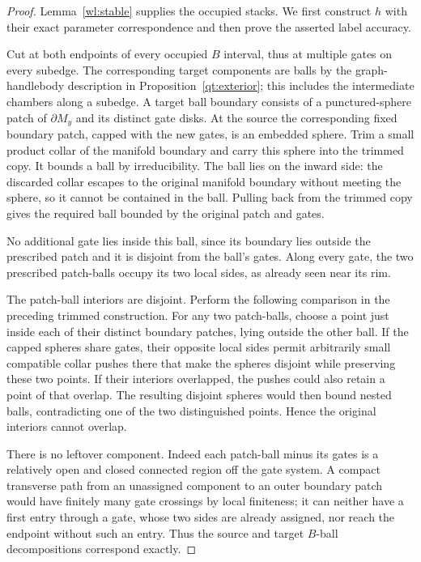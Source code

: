 \documentclass[11pt]{article}
\numberwithin{equation}{section}
\theoremstyle{definition}
\theoremstyle{remark}
\begin{document}
\begin{proof}
Lemma~\ref{wl:stable} supplies the occupied stacks.  We first construct
$h$ with their exact parameter correspondence and then prove the
asserted label accuracy.

Cut at both endpoints of every occupied $B$ interval, thus at
multiple gates on every subedge.  The corresponding target
components are balls by the graph-handlebody description in
Proposition~\ref{qt:exterior}; this includes the intermediate
chambers along a subedge.  A target ball boundary consists of a
punctured-sphere patch of $\partial M_y$ and its distinct gate disks.
At the source the corresponding fixed boundary patch, capped with
the new gates, is an embedded sphere.  Trim a small product collar
of the manifold boundary and carry this sphere into the trimmed
copy.  It bounds a ball by irreducibility.  The ball lies on the
inward side: the discarded collar escapes to the original manifold
boundary without meeting the sphere, so it cannot be contained in
the ball.  Pulling back from the trimmed copy gives the required
ball bounded by the original patch and gates.

No additional gate lies inside this ball, since its boundary lies
outside the prescribed patch and it is disjoint from the ball's
gates.  Along every gate, the two prescribed patch-balls occupy its
two local sides, as already seen near its rim.

The patch-ball interiors are disjoint.  Perform the following
comparison in the preceding trimmed construction.  For any two
patch-balls, choose a point just inside each of their distinct
boundary patches, lying outside the other ball.  If the capped
spheres share gates, their opposite local sides permit arbitrarily
small compatible collar pushes there that make the spheres disjoint
while preserving these two points.  If their interiors overlapped,
the pushes could also retain a point of that overlap.  The resulting
disjoint spheres would then bound nested balls, contradicting one of
the two distinguished points.  Hence the original interiors cannot
overlap.

There is no leftover component.  Indeed each patch-ball minus its
gates is a relatively
open and closed connected region off the gate system.  A compact
transverse path from an unassigned component to an outer boundary
patch would have finitely many gate crossings by local finiteness;
it can neither have a first entry through a gate, whose two sides
are already assigned, nor reach the endpoint without such an
entry.  Thus the source and target $B$-ball decompositions
correspond exactly.


\end{proof}
\end{document}
